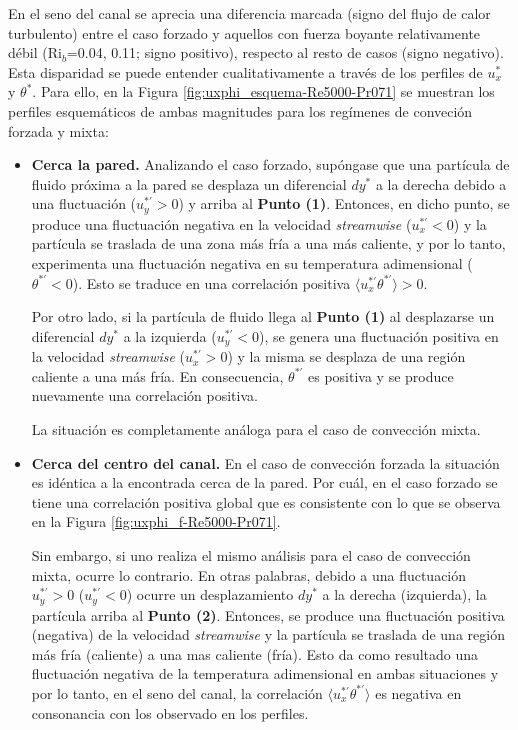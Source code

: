 En el seno del canal se aprecia una diferencia marcada (signo del flujo de calor turbulento) entre el caso forzado y aquellos con fuerza boyante relativamente débil (Ri$_b$=0.04, 0.11; signo positivo), respecto al resto de casos (signo negativo). Esta disparidad se puede entender cualitativamente a través de los perfiles de $u^*_x$ y $\theta^*$. Para ello, en la Figura \ref{fig:uxphi_esquema-Re5000-Pr071} se muestran los perfiles esquemáticos de ambas magnitudes para los regímenes de conveción forzada y mixta:

\begin{itemize}

\item \textbf{Cerca la pared.} Analizando el caso forzado, supóngase que una partícula de fluido próxima a la pared se desplaza un diferencial $dy^*$ a la derecha debido a una fluctuación ($u^{* \prime}_y >0$) y arriba al \textbf{Punto (1)}. Entonces, en dicho punto, se produce una fluctuación negativa en la velocidad \textit{streamwise} ($u^{* \prime}_x <0$) y la partícula se traslada de una zona más fría a una más caliente, y por lo tanto, experimenta una fluctuación negativa en su temperatura adimensional ($\theta^{* \prime}<0$). Esto se traduce en una correlación positiva $\langle u_x^{\ast \prime } \theta^{\ast \prime } \rangle > 0$. 

Por otro lado, si la partícula de fluido llega al \textbf{Punto (1)} al desplazarse un diferencial $dy^*$ a la izquierda ($u^{* \prime}_y <0$), se genera una fluctuación positiva en la velocidad \textit{streamwise}  ($u^{* \prime}_x >0$) y la misma se desplaza de una región caliente a una más fría. En consecuencia, $\theta^{* \prime}$ es positiva y se produce nuevamente una correlación positiva.

La situación es completamente análoga para el caso de convección mixta.

\item \textbf{Cerca del centro del canal.} En el caso de convección forzada la situación es idéntica a la encontrada cerca de la pared. Por cuál, en el caso forzado se tiene una correlación positiva global que es consistente con lo que se observa en la Figura \ref{fig:uxphi_f-Re5000-Pr071}. 

Sin embargo, si uno realiza el mismo análisis para el caso de convección mixta, ocurre lo contrario. En otras palabras, debido a una fluctuación $u^{* \prime}_y >0$ ($u^{* \prime}_y <0$) ocurre un desplazamiento $dy^*$ a la derecha (izquierda), la partícula arriba al \textbf{Punto (2)}. Entonces, se produce una fluctuación positiva (negativa) de la velocidad \textit{streamwise}  y la partícula se traslada de una región más fría (caliente) a una mas caliente (fría). Esto da como resultado una fluctuación negativa de la temperatura adimensional en ambas situaciones y por lo tanto, en el seno del canal, la correlación $\langle u_x^{\ast \prime } \theta^{\ast \prime } \rangle$ es negativa en consonancia con los observado en los perfiles.
\end{itemize}  
